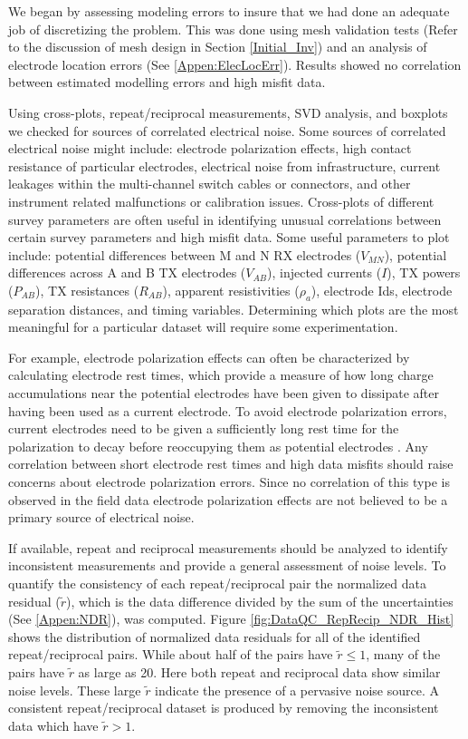 \documentclass[final,authoryear,5p,times,twocolumn]{elsarticle}
\begin{document}
We began by assessing modeling errors to insure that we had done an adequate job of discretizing the problem. This was done using mesh validation tests (Refer to the discussion of mesh design in Section \ref{Initial_Inv}) and an analysis of electrode location errors (See \ref{Appen:ElecLocErr}). Results showed no correlation between estimated modelling errors and high misfit data.

Using cross-plots, repeat/reciprocal measurements, SVD analysis, and boxplots we checked for sources of correlated electrical noise. Some sources of correlated electrical noise might include: electrode polarization effects, high contact resistance of particular electrodes, electrical noise from infrastructure, current leakages within the multi-channel switch cables or connectors, and other instrument related malfunctions or calibration issues. Cross-plots of different survey parameters are often useful in identifying unusual correlations between certain survey parameters and high misfit data. Some useful parameters to plot include: potential differences between M and N RX electrodes ($V_{MN}$), potential differences across A and B TX electrodes ($V_{AB}$), injected currents ($I$), TX powers ($P_{AB}$), TX resistances ($R_{AB}$), apparent resistivities ($\rho_a$), electrode Ids, electrode separation distances, and timing variables. Determining which plots are the most meaningful for a particular dataset will require some experimentation.

For example, electrode polarization effects can often be characterized by calculating electrode rest times, which provide a measure of how long charge accumulations near the potential electrodes have been given to dissipate after having been used as a current electrode. To avoid electrode polarization errors, current electrodes need to be given a sufficiently long rest time for the polarization to decay before reoccupying them as potential electrodes \citep{Dahlin2000,Merriam2005,Wilkinson2012}. Any correlation between short electrode rest times and high data misfits should raise concerns about electrode polarization errors. Since no correlation of this type is observed in the field data electrode polarization effects are not believed to be a primary source of electrical noise.

If available, repeat and reciprocal measurements should be analyzed to identify inconsistent measurements and provide a general assessment of noise levels. To quantify the consistency of each repeat/reciprocal pair the normalized data residual ($\tilde{r}$), which is the data difference divided by the sum of the uncertainties (See \ref{Appen:NDR}), was computed. Figure \ref{fig:DataQC_RepRecip_NDR_Hist} shows the distribution of normalized data residuals for all of the identified repeat/reciprocal pairs. While about half of the pairs have $\tilde{r} \leq 1$, many of the pairs have $\tilde{r}$ as large as 20. Here both repeat and reciprocal data show similar noise levels. These large $\tilde{r}$ indicate the presence of a pervasive noise source. A consistent repeat/reciprocal dataset is produced by removing the inconsistent data which have $\tilde{r} > 1$.
\end{document}
